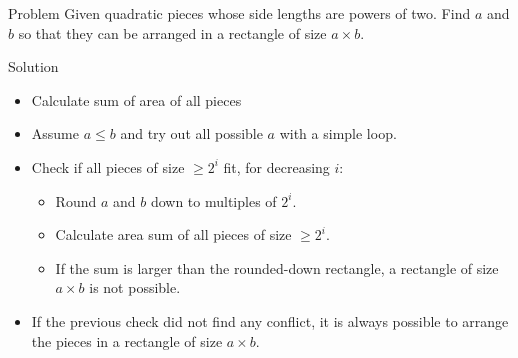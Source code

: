 \begin{slide}
  \begin{block}{Problem}
    Given quadratic pieces whose side lengths are powers of two. Find $a$ and $b$ so that they can be arranged in a rectangle of size $a \times b$.
  \end{block}
  \pause
  \begin{block}{Solution}
    \begin{itemize}
      \item Calculate sum of area of all pieces
      \item Assume $a \leq b$ and try out all possible $a$ with a simple loop.
      \item Check if all pieces of size $\geq 2^i$ fit, for decreasing $i$:
      \begin{itemize}
        \item Round $a$ and $b$ down to multiples of $2^i$.
        \item Calculate area sum of all pieces of size $\geq 2^i$.
        \item If the sum is larger than the rounded-down rectangle, a rectangle of size $a \times b$ is not possible.
      \end{itemize}
      \item If the previous check did not find any conflict, it is always possible to arrange the pieces in a rectangle of size $a \times b$.
    \end{itemize}
  \end{block}
\end{slide} 
